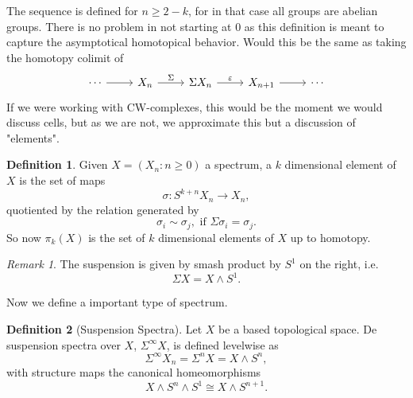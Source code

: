 \documentclass[a4paper,english,11pt]{article}
\theoremstyle{definition}
\newtheorem{Def}{Definition}
\theoremstyle{plain}
\theoremstyle{remark}
\newtheorem{rem}{\color{red}Remark}
\newcommand{\Susp}{\Sigma^{\infty}}
\begin{document}
{\color{purple} The sequence is defined for \(n\geq 2-k\), for in that case all groups are abelian groups}. 
There is no problem in not starting at \(0\) as this definition is meant to capture the asymptotical homotopical behavior. Would this be the same as taking the homotopy colimit of
\begin{equation*}
  \begin{tikzcd}
    \cdots\arrow{r}& X_n \arrow{r}{\Sigma}&\Sigma X_n\arrow{r}{\varepsilon}&X_{n+1}\arrow{r}&\cdots
  \end{tikzcd}
\end{equation*}
If we were working with CW-complexes, this would be the moment we would discuss cells, but as we are not, we approximate this but a discussion of "elements".
\begin{Def}
  Given \(X=(X_n:n\geq 0)\) a spectrum, a \(k\) dimensional element of \(X\) is the set of maps
  \[\sigma:S^{k+n}X_n\to X_n,\]
  quotiented by the relation generated by
  \[\sigma_i\sim\sigma_j, \text{ if } \Sigma\sigma_i=\sigma_j.\]
  So now \(\pi_k(X)\) is the set of \(k\) dimensional elements of \(X\) up to homotopy.
\end{Def}  
\begin{rem}
  The suspension is given by smash product by \(S^1\) {\color{red} on the right}, i.e.
  \[\Sigma X=X\wedge S^1.\]
\end{rem}
  Now we define a important type of spectrum.
  \begin{Def}[Suspension Spectra]
    Let \(X\) be a based topological space. De suspension spectra over \(X\), \(\Susp X\), is defined levelwise as 
    \[\Susp X_n=\Sigma^{n}X=X\wedge S^n,\]
    with structure maps the canonical homeomorphisms
    \[X\wedge S^n\wedge S^1 \cong X\wedge S^{n+1}.\]
  \end{Def}
\end{document}
